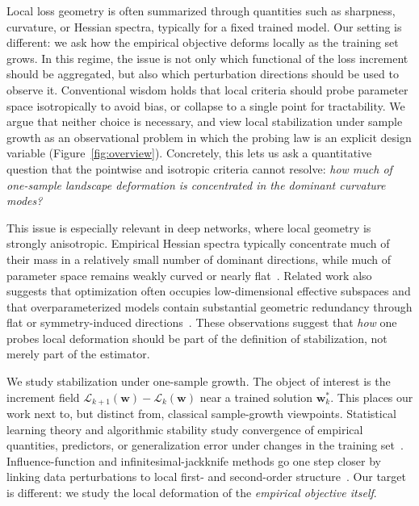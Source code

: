 \documentclass{article}
\begin{document}
Local loss geometry is often summarized through quantities such as sharpness, curvature, or Hessian spectra, typically for a fixed trained model. Our setting is different: we ask how the empirical objective deforms locally as the training set grows. In this regime, the issue is not only which functional of the loss increment should be aggregated, but also which perturbation directions should be used to observe it. Conventional wisdom holds that local criteria should probe parameter space isotropically to avoid bias, or collapse to a single point for tractability. We argue that neither choice is necessary, and view local stabilization under sample growth as an observational problem in which the probing law is an explicit design variable (Figure~\ref{fig:overview}). Concretely, this lets us ask a quantitative question that the pointwise and isotropic criteria cannot resolve: \emph{how much of one-sample landscape deformation is concentrated in the dominant curvature modes?}

This issue is especially relevant in deep networks, where local geometry is strongly anisotropic. Empirical Hessian spectra typically concentrate much of their mass in a relatively small number of dominant directions, while much of parameter space remains weakly curved or nearly flat~\citep{li2018visualizing,sagun2017hessian,ghorbani2019investigation,papyan2019fullspectrum,xu2024mining}. Related work also suggests that optimization often occupies low-dimensional effective subspaces and that overparameterized models contain substantial geometric redundancy through flat or symmetry-induced directions~\citep{gurari2018tiny,li2018intrinsic,simsek2021geometry,draxler2018essentially,garipov2018mode}. These observations suggest that \emph{how} one probes local deformation should be part of the definition of stabilization, not merely part of the estimator.

We study stabilization under one-sample growth. The object of interest is the increment field $\mathcal L_{k+1}(\mathbf w)-\mathcal L_k(\mathbf w)$ near a trained solution $\mathbf w_k^*$. This places our work next to, but distinct from, classical sample-growth viewpoints. Statistical learning theory and algorithmic stability study convergence of empirical quantities, predictors, or generalization error under changes in the training set~\citep{vapnik1998statistical,shalev2014understanding,bousquet2002stability,hardt2016train,bousquet2020sharper}. Influence-function and infinitesimal-jackknife methods go one step closer by linking data perturbations to local first- and second-order structure~\citep{koh2017influence,giordano2019swiss,koh2019group,basu2020secondorder}. Our target is different: we study the local deformation of the \emph{empirical objective itself}.
\end{document}
